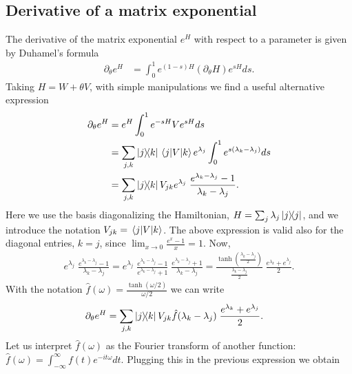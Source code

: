 \documentclass[
    aps,
    prx,
    floatfix,
    nofootinbib,
    onecolumn
]{revtex4-2}
\begin{document}
\subsection{Derivative of a matrix exponential}
The derivative of the matrix exponential $e^H$ with respect to a parameter is given by Duhamel's formula
\begin{align}
\label{eq:duhamel}
    \partial_\theta e^H &= \int_0^1 e^{(1-s)H} (\partial_\theta H) e^{s H} ds .
\end{align}
Taking $H=W+\theta V$, with simple manipulations we find a useful alternative expression
\begin{align}
\label{eq:manip1}
\begin{split}
    \partial_\theta e^H &= e^H \int_0^1 e^{-sH} V e^{s H} ds \\
    &= \sum_{j,k} \ketbra{j}{k} \matrixel{j}{V}{k} e^{\lambda_j} \int_0^1 e^{s(\lambda_k - \lambda_j)} ds \\
    &= \sum_{j,k} \ketbra{j}{k} V_{jk} e^{\lambda_j} \; \frac{e^{\lambda_k - \lambda_j} - 1}{\lambda_k - \lambda_j} .
\end{split}
\end{align}
Here we use the basis diagonalizing the Hamiltonian, $H = \sum_{j} \lambda_j \dyad{j}$, and we introduce the notation $V_{jk} = \matrixel{j}{V}{k}$. The above expression is valid also for the diagonal entries, $k=j$, since $\lim_{x \rightarrow 0} \frac{e^x - 1}{x} = 1$.  Now,
\begin{align}
    e^{\lambda_j} \; \frac{e^{\lambda_k - \lambda_j} - 1}{\lambda_k - \lambda_j}  =  e^{\lambda_j} \; \frac{e^{\lambda_k - \lambda_j} - 1}{e^{\lambda_k - \lambda_j} +1 } \; \frac{e^{\lambda_k - \lambda_j} +1 }{\lambda_k - \lambda_j}  =  \frac{\tanh( \tfrac{\lambda_k - \lambda_j}{2})}{ \tfrac{\lambda_k - \lambda_j}{2} } \; \frac{e^{\lambda_k} + e^{\lambda_j} }{2} .
\end{align}
With the notation $\hat{f}(\omega) = \frac{\tanh(\omega/2)}{\omega/2}$ we can write
\begin{align}
    \partial_\theta e^H &= \sum_{j,k} \ketbra{j}{k} V_{jk} \hat{f}(\lambda_k - \lambda_j) \; \frac{e^{\lambda_k} + e^{\lambda_j} }{2} .
\end{align}
Let us interpret $\hat{f}(\omega)$ as the Fourier transform of another function: $\hat{f}(\omega) = \int_{-\infty}^\infty f(t) e^{-i t \omega} dt$. Plugging this in the previous expression we obtain
\end{document}
